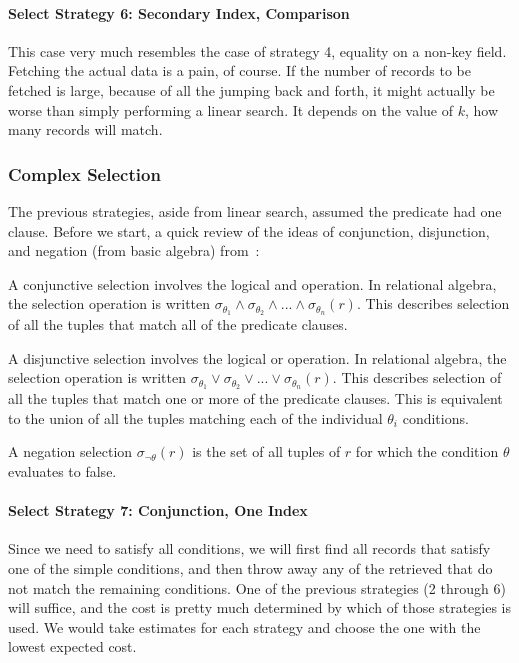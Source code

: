 \paragraph*{Select Strategy 6: Secondary Index, Comparison}
This case very much resembles the case of strategy 4, equality on a non-key field. Fetching the actual data is a pain, of course. If the number of records to be fetched is large, because of all the jumping back and forth, it might actually be worse than simply performing a linear search.  It depends on the value of $k$, how many records will match. 

\subsubsection*{Complex Selection}

The previous strategies, aside from linear search, assumed the predicate had one clause. Before we start, a quick review of the ideas of conjunction, disjunction, and negation (from basic algebra) from~\cite{dsc}:

A conjunctive selection involves the logical and operation. In relational algebra, the selection operation is written $\sigma_{\theta_{1}} \wedge \sigma_{\theta_{2}} \wedge ... \wedge \sigma_{\theta _{n}}( r )$. This describes selection of all the tuples that match all of the predicate clauses.

A disjunctive selection involves the logical or operation. In relational algebra, the selection operation is written $\sigma_{\theta_{1}} \vee \sigma_{\theta_{2}} \vee ... \vee \sigma_{\theta _{n}}( r )$. This describes selection of all the tuples that match one or more of the predicate clauses. This is equivalent to the union of all the tuples matching each of the individual $\theta_{i}$ conditions.

A negation selection $\sigma_{\neg \theta}(r)$ is the set of all tuples of $r$ for which the condition $\theta$ evaluates to false. 

\paragraph{Select Strategy 7: Conjunction, One Index}
Since we need to satisfy all conditions, we will first find all records that satisfy one of the simple conditions, and then throw away any of the retrieved that do not match the remaining conditions. One of the previous strategies (2 through 6) will suffice, and the cost is pretty much determined by which of those strategies is used. We would take estimates for each strategy and choose the one with the lowest expected cost.

